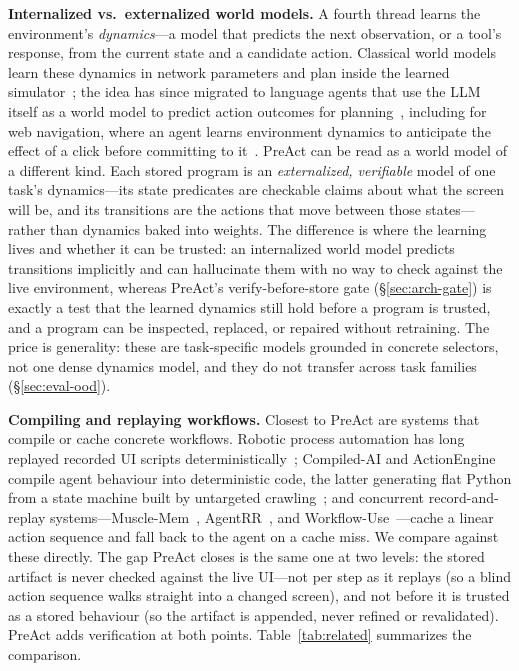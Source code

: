 \documentclass[11pt]{article}
\begin{document}
\textbf{Internalized vs.\ externalized world models.} A fourth thread learns the environment's \emph{dynamics}---a model that predicts the next observation, or a tool's response, from the current state and a candidate action. Classical world models learn these dynamics in network parameters and plan inside the learned simulator~\cite{ha2018worldmodels,hafner2023dreamerv3}; the idea has since migrated to language agents that use the LLM itself as a world model to predict action outcomes for planning~\cite{hao2023rap}, including for web navigation, where an agent learns environment dynamics to anticipate the effect of a click before committing to it~\cite{chae2024wma}. PreAct can be read as a world model of a different kind. Each stored program is an \emph{externalized, verifiable} model of one task's dynamics---its state predicates are checkable claims about what the screen will be, and its transitions are the actions that move between those states---rather than dynamics baked into weights. The difference is where the learning lives and whether it can be trusted: an internalized world model predicts transitions implicitly and can hallucinate them with no way to check against the live environment, whereas PreAct's verify-before-store gate (\S\ref{sec:arch-gate}) is exactly a test that the learned dynamics still hold before a program is trusted, and a program can be inspected, replaced, or repaired without retraining. The price is generality: these are task-specific models grounded in concrete selectors, not one dense dynamics model, and they do not transfer across task families (\S\ref{sec:eval-ood}).

\textbf{Compiling and replaying workflows.} Closest to PreAct are systems that compile or cache concrete workflows. Robotic process automation has long replayed recorded UI scripts deterministically~\cite{aalst2018rpa}; Compiled-AI and ActionEngine compile agent behaviour into deterministic code, the latter generating flat Python from a state machine built by untargeted crawling~\cite{compiledai2026,actionengine2026}; and concurrent record-and-replay systems---Muscle-Mem~\cite{musclemem}, AgentRR~\cite{agentrr2025}, and Workflow-Use~\cite{workflowuse}---cache a linear action sequence and fall back to the agent on a cache miss. We compare against these directly. The gap PreAct closes is the same one at two levels: the stored artifact is never checked against the live UI---not per step as it replays (so a blind action sequence walks straight into a changed screen), and not before it is trusted as a stored behaviour (so the artifact is appended, never refined or revalidated). PreAct adds verification at both points. Table~\ref{tab:related} summarizes the comparison.
\end{document}

